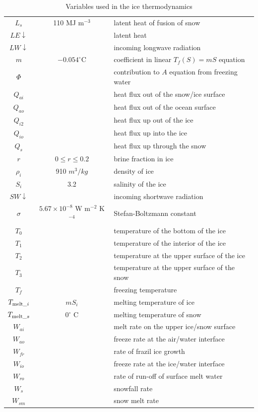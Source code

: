 \begin{table}
{\begin{tabular}{|c|c|l|}
  $L_s$ & 110 MJ m$^{-3}$ & latent heat of fusion of snow \\
  $LE\!\downarrow$ && latent heat \\
  $LW\!\!\downarrow$ && incoming longwave radiation \\
  $m$ & $-0.054^\circ$C & coefficient in linear $T_f(S) = mS$ equation \\
  $\Phi$ && contribution to $A$ equation from freezing water \\
  $Q_{ai}$ && heat flux out of the snow/ice surface \\
  $Q_{ao}$ && heat flux out of the ocean surface \\
  $Q_{i2}$ && heat flux up out of the ice \\
  $Q_{io}$ && heat flux up into the ice \\
  $Q_{s}$  && heat flux up through the snow \\
  $r$   & $0 \le r \le 0.2 $ & brine fraction in ice \\
  $\rho_i$ & 910 $m^3/kg$ & density of ice \\
  $S_i$ & 3.2 & salinity of the ice \\
  $SW\!\!\downarrow$ && incoming shortwave radiation \\
  $\sigma$ & $5.67 \times 10^{-8}$ W m$^{-2}$ K$^{-4}$ &
  Stefan-Boltzmann constant \\
  $T_0$ && temperature of the bottom of the ice \\
  $T_1$ && temperature of the interior of the ice \\
  $T_2$ && temperature at the upper surface of the ice \\
  $T_3$ && temperature at the upper surface of the snow \\
  $T_f$ && freezing temperature \\
  $T_{{\rm melt}\_i}$ & $mS_i$ & melting temperature of ice \\
  $T_{{\rm melt}\_s}$ & 0$^\circ$ C & melting temperature of snow \\
  $W_{ai}$ && melt rate on the upper ice/snow surface \\
  $W_{ao}$ && freeze rate at the air/water interface \\
  $W_{fr}$ && rate of frazil ice growth \\
  $W_{io}$ && freeze rate at the ice/water interface \\
  $W_{ro}$ && rate of run-off of surface melt water \\
  $W_{s}$  && snowfall rate \\
  $W_{sm}$ && snow melt rate \\
  \hline
\end{tabular}
}
\caption{Variables used in the ice thermodynamics}
\label{thermvar}
\end{table}

